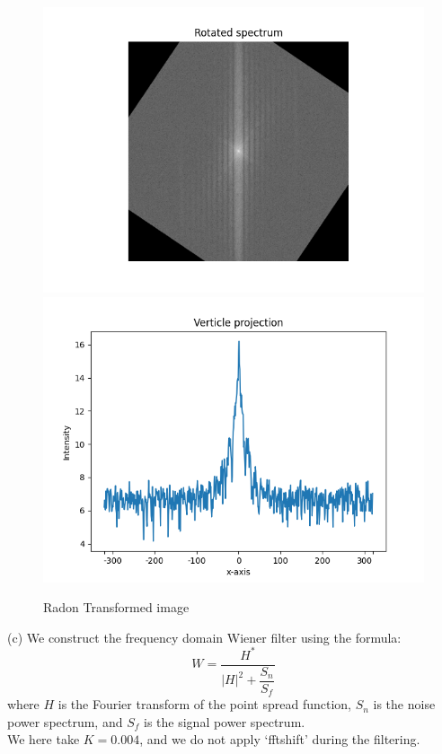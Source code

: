 \begin{figure}[htbp]
    \centering
	\includegraphics[width=\textwidth]{../images/p4/p4b_rotated_image.png}
	\includegraphics[width=\textwidth]{../images/p4/p4b_intensity.png}
    \caption{Radon Transformed image}
    \label{fig:p4b}
\end{figure}



(c)
We construct the frequency domain Wiener filter using the formula:
$$W = \dfrac{H^*}{|H|^2+\dfrac{S_n}{S_f}}$$
where $H$ is the Fourier transform of the point spread function, $S_n$ is the noise power spectrum, and $S_f$ is the signal power spectrum.\\
We here take $K=0.004$, and we do not apply `fftshift' during the filtering.

